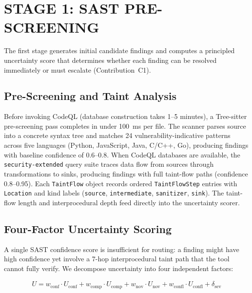 \section{\uppercase{Stage 1: SAST Pre-Screening}}
\label{sec:sast}

The first stage generates initial candidate findings and computes a principled uncertainty score that determines whether each finding can be resolved immediately or must escalate (Contribution~C1).

\subsection{Pre-Screening and Taint Analysis}

Before invoking CodeQL (database construction takes 1--5 minutes), a Tree-sitter pre-screening pass completes in under 100~ms per file. The scanner parses source into a concrete syntax tree and matches 24 vulnerability-indicative patterns across five languages (Python, JavaScript, Java, C/C++, Go), producing findings with baseline confidence of 0.6--0.8. When CodeQL databases are available, the \texttt{security-extended} query suite traces data flow from sources through transformations to sinks, producing findings with full taint-flow paths (confidence 0.8--0.95). Each \texttt{TaintFlow} object records ordered \texttt{TaintFlowStep} entries with \texttt{Location} and kind labels (\texttt{source}, \texttt{intermediate}, \texttt{sanitizer}, \texttt{sink}). The taint-flow length and interprocedural depth feed directly into the uncertainty scorer.

\subsection{Four-Factor Uncertainty Scoring}

A single SAST confidence score is insufficient for routing: a finding might have high confidence yet involve a 7-hop interprocedural taint path that the tool cannot fully verify. We decompose uncertainty into four independent factors:

\begin{align}
U = w_{\text{conf}} \cdot U_{\text{conf}} + w_{\text{comp}} \cdot U_{\text{comp}} + w_{\text{nov}} \cdot U_{\text{nov}} + w_{\text{confl}} \cdot U_{\text{confl}} + \delta_{\text{sev}}
\label{eq:uncertainty}
\end{align}

